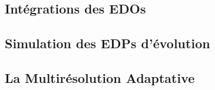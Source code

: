 \subsection{Intégrations des EDOs}




\subsection{Simulation des EDPs d'évolution}



\subsection{La Multirésolution Adaptative}
